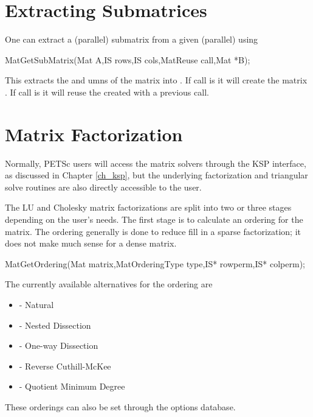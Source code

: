 {{{\medskip \medskip

\section{Extracting Submatrices} 

One can extract a (parallel) submatrix from a given (parallel) using
\begin{tabbing}
  MatGetSubMatrix(Mat A,IS rows,IS cols,MatReuse call,Mat *B);
\end{tabbing}
This extracts the  and umns of the matrix  into . If
call is    it will create the matrix
. If call is   it will reuse the 
created with a previous call.

\medskip \medskip

\section{Matrix Factorization} 
\label{sec_matfactor}

Normally, PETSc users will access the matrix solvers through the
KSP interface, as discussed in Chapter \ref{ch_ksp}, but the underlying
factorization and triangular solve routines are also directly
accessible to the user.

\medskip \medskip

The LU and Cholesky 
matrix factorizations are split into 
two or three stages depending on the user's needs. The first stage is
to calculate an ordering for the matrix.  The ordering generally is
done to reduce fill in a sparse factorization; it does not make much
sense for a dense matrix.  
\begin{tabbing}
  MatGetOrdering(Mat matrix,MatOrderingType type,IS* rowperm,IS* colperm);
\end{tabbing}
The currently available alternatives for the ordering  are
\begin{itemize}
\item {} - Natural
\item {} - Nested Dissection
\item {} - One-way Dissection
\item {} - Reverse Cuthill-McKee
\item {} - Quotient Minimum Degree
\end{itemize}
These orderings can also be set through the options database.

}}}

